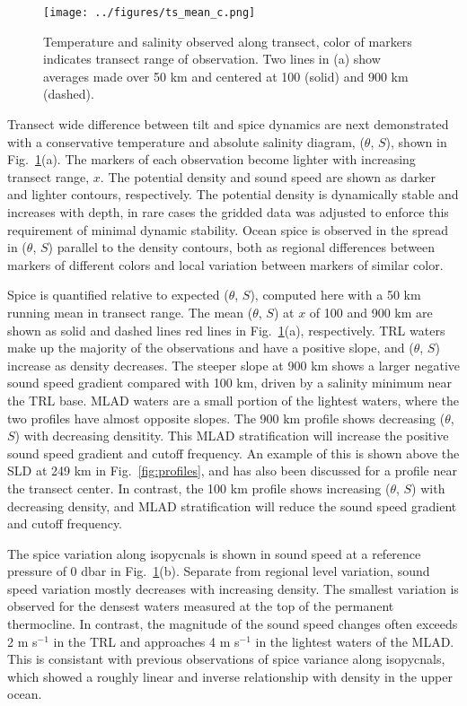 \documentclass[preprint,NumberedRefs]{JASA}
\begin{document}
\begin{figure}
\texttt{[image: ../figures/ts\_mean\_c.png]}
    \caption{\label{fig:ts_diagram}{Temperature and salinity observed along transect, color of markers indicates transect range of observation. Two lines in (a) show averages made over 50 km and centered at 100 (solid) and 900 km (dashed).}}
\end{figure}
Transect wide difference between tilt and spice dynamics are next demonstrated with a conservative temperature and absolute salinity diagram\cite{TEOS10}, ($\theta$, $S$), shown in Fig.~\ref{fig:ts_diagram}(a). The markers of each observation become lighter with increasing transect range, $x$. The potential density and sound speed are shown as darker and lighter contours, respectively. The potential density is dynamically stable and increases with depth, in rare cases the gridded data was adjusted to enforce this requirement of minimal dynamic stability\citep{barker2017stabilizing}. Ocean spice is observed in the spread in ($\theta$, $S$) parallel to the density contours, both as regional differences between markers of different colors and local variation between markers of similar color.

Spice is quantified relative to expected ($\theta$, $S$), computed here with a 50 km running mean in transect range. The mean ($\theta$, $S$) at $x$ of 100 and 900 km are shown as solid and dashed lines red lines in Fig.~\ref{fig:ts_diagram}(a), respectively. TRL waters make up the majority of the observations and have a positive slope, and ($\theta$, $S$) increase as density decreases. The steeper slope at 900 km shows a larger negative sound speed gradient compared with 100 km, driven by a salinity minimum near the TRL base. MLAD waters are a small portion of the lightest waters, where the two profiles have almost opposite slopes. The 900 km profile shows decreasing ($\theta$, $S$) with decreasing densitity. This MLAD stratification will increase the positive sound speed gradient and cutoff frequency. An example of this is shown above the SLD at 249 km in Fig.~\ref{fig:profiles}, and has also been discussed for a profile near the transect center.\cite{colosi2020observations} In contrast, the 100 km profile shows increasing ($\theta$, $S$) with decreasing density, and MLAD stratification will reduce the sound speed gradient and cutoff frequency.

The spice variation along isopycnals is shown in sound speed at a reference pressure of 0 dbar in Fig.~\ref{fig:ts_diagram}(b). Separate from regional level variation, sound speed variation mostly decreases with increasing density. The smallest variation is observed for the densest waters measured at the top of the permanent thermocline\cite{cole2010seasonal}. In contrast, the magnitude of the sound speed changes often exceeds 2 m s$^{-1}$ in the TRL and approaches 4 m s$^{-1}$ in the lightest waters of the MLAD. This is consistant with previous observations of spice variance along isopycnals, which showed a roughly linear and inverse relationship with density in the upper ocean\cite{ferrari2000}.
\end{document}
